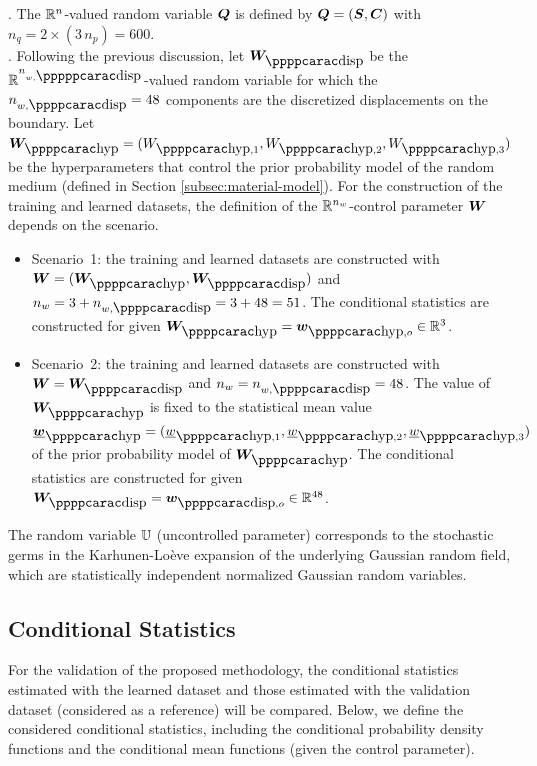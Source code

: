 . The ${\mathbb{R}}^n$-valued random variable ${\boldsymbol{Q}}$ is defined by ${\boldsymbol{Q}} = ({\boldsymbol{S}},{\boldsymbol{C}})$ with $n_q = 2\times (3\, n_p) = 600$.\\

.
Following the previous discussion, let $\bfW_\dispp$ be the $\RR^{n_{w,\disppp}}$-valued random variable for which the $n_{w,\dispp}= 48$ components are the discretized displacements on the boundary.
Let $\bfW_\hypp = (W_{\hypp,1},W_{\hypp,2},W_{\hypp,3})$ be the hyperparameters that control the prior probability model of the random medium (defined in Section \ref{subsec:material-model}). For the construction of the training and learned datasets, the definition of the ${\mathbb{R}}^{n_w}$-control parameter ${\boldsymbol{W}}$ depends on the scenario.
%
\begin{itemize}
%
\item Scenario~1: the training and learned datasets are constructed with $\bfW = (\bfW_\hypp,\bfW_\dispp)$ and $n_w = 3 + n_{w,\dispp} = 3+48=51$. The conditional statistics are constructed for given $\bfW_\hypp = \bfw_{\hypp,o} \in\RR^3$.
%
\item Scenario~2: the training and learned datasets are constructed with $\bfW = \bfW_\dispp$ and $n_w = n_{w,\dispp}=48$. The value of $\bfW_\hypp$ is fixed to the statistical mean value
$\underline{\bfw}_\hypp = (\underline w_{\hypp,1},\underline w_{\hypp,2}, \underline w_{\hypp,3})$ of the prior probability model of  $\bfW_\hypp$. The conditional statistics are constructed for given $\bfW_\dispp = \bfw_{\dispp,o} \in\RR^{48}$.
%
\end{itemize}

The random variable ${\mathbb{U}}$ (uncontrolled parameter) corresponds to the stochastic germs in the Karhunen-Lo\`eve expansion of the underlying Gaussian random field, which are statistically independent normalized Gaussian random variables.

%
\subsection{Conditional Statistics}
\label{sec:PLoMappli.2}
%
For the validation of the proposed methodology, the conditional statistics estimated with the learned dataset and those estimated with the validation dataset (considered as a reference) will be compared. Below, we define the considered conditional statistics, including the conditional probability density functions and the conditional mean functions (given the control parameter).

